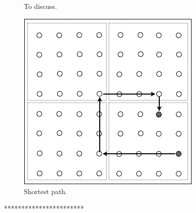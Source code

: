 \begin{enumerate}
{\begin{figure}[hbt]
\begin{center}
       \caption{To discuss.}
\end{center}
\end{figure}
 \begin{figure}[hbt]
\begin{center}
       \includegraphics[scale=0.5]{FiguresGraph/routingCity3}
       \caption{Shortest path.}
\end{center}
\end{figure}
***********************}
\end{enumerate}

